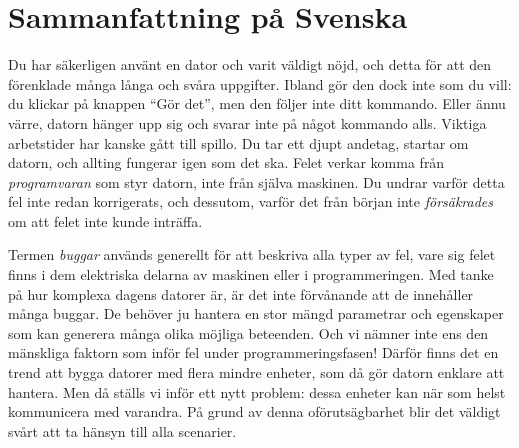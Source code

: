 \chapter*{Sammanfattning på Svenska \texorpdfstring{\hfill{}}{}}

Du har säkerligen använt en dator och varit väldigt nöjd, och detta
för att den förenklade många långa och svåra %
uppgifter.
%
Ibland gör den dock inte som du vill: du klickar på knappen ``Gör
det'', men den följer inte ditt kommando. Eller ännu värre, datorn
hänger upp sig och svarar inte på något kommando alls.
%
Viktiga arbetstider har kanske gått till spillo.
%
Du tar ett djupt andetag, startar om datorn, och allting fungerar igen
som det ska.
%
Felet verkar komma från \emph{programvaran} som styr datorn, inte från
själva maskinen.
%
Du undrar varför detta fel inte redan korrigerats, och dessutom,
varför det från början inte \emph{försäkrades} om att felet inte kunde
inträffa.


Termen \emph{buggar} används generellt för att beskriva alla typer av
fel, vare sig felet finns i dem elektriska delarna av maskinen eller i
programmeringen.
%
Med tanke på hur komplexa dagens datorer är, är det inte förvånande
att de innehåller många buggar.
%
De behöver ju %
hantera en stor mängd parametrar och egenskaper som kan generera
många olika möjliga beteenden.
%
Och vi nämner inte ens den mänskliga faktorn som inför fel under
programmeringsfasen!
%
Därför finns det en trend att bygga datorer med flera mindre enheter,
som då gör datorn enklare att hantera.
%
Men då ställs vi inför ett nytt problem: dessa enheter kan när som
helst kommunicera med varandra.
%
På grund av denna oförutsägbarhet blir det väldigt svårt att ta hänsyn
till alla scenarier.

